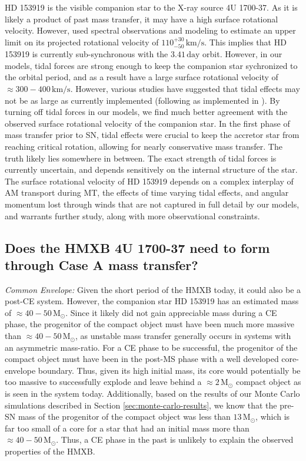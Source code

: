 \documentclass[linenumbers,trackchanges,twocolumn]{aastex701}
\newcommand{\Mdot}{\mathrm{M}_{\odot}}
\begin{document}
HD 153919 is the visible companion star to the X-ray source 4U 1700-37. As it is likely a product of past mass transfer, it may have a high surface rotational velocity. However, \cite{2020A&A...634A..49H} used spectral observations and modeling to estimate an upper limit on its projected rotational velocity of $110^{+30}_{-50}\,\mathrm{km/s}$. This implies that HD 153919 is currently sub-synchronous with the $3.41\,\mathrm{day}$ orbit.
However, in our models, tidal forces are strong enough to keep the companion star sychronized to the orbital period, and as a result have a large surface rotational velocity of $\approx 300-400\,\mathrm{km/s}$. However, various studies \citep[e.g.,][]{2018A&A...616A..28Q, 2023ApJ...952...53M} have suggested that tidal effects may not be as large as currently implemented (following \citealp{1977A&A....57..383Z} as implemented in \citealp{2002MNRAS.329..897H}). By turning off tidal forces in our models, we find much better agreement with the observed surface rotational velocity of the companion star. In the first phase of mass transfer prior to SN, tidal effects were crucial to keep the accretor star from reaching critical rotation, allowing for nearly conservative mass transfer. The truth likely lies somewhere in between. The exact strength of tidal forces is currently uncertain, and depends sensitively on the internal structure of the star. The surface rotational velocity of HD 153919 depends on a complex interplay of AM transport during MT, the effects of time varying tidal effects, and angular momentum lost through winds that are not captured in full detail by our models, and warrants further study, along with more observational constraints.

\subsection{Does the HMXB 4U 1700-37 need to form through Case A mass transfer?} \label{caseA}

\textit{Common Envelope:} Given the short period of the HMXB today, it could also be a post-CE system. However, the companion star HD 153919 has an estimated mass of $\approx 40-50\,\Mdot$. Since it likely did not gain appreciable mass during a CE phase, the progenitor of the compact object must have been much more massive than $\approx 40-50\,\Mdot$, as unstable mass transfer generally occurs in systems with an asymmetric mass-ratio. For a CE phase to be successful, the progenitor of the compact object must have been in the post-MS phase with a well developed core-envelope boundary. Thus, given its high initial mass, its core would potentially be too massive to successfully explode and leave behind a $\approx 2\,\Mdot$ compact object as is seen in the system today. Additionally, based on the results of our Monte Carlo simulations described in Section \ref{sec:monte-carlo-results}, we know that the pre-SN mass of the progenitor of the compact object was less than $13\,\Mdot$, which is far too small of a core for a star that had an initial mass more than $\approx 40-50\,\Mdot$. Thus, a CE phase in the past is unlikely to explain the observed properties of the HMXB.
\end{document}

